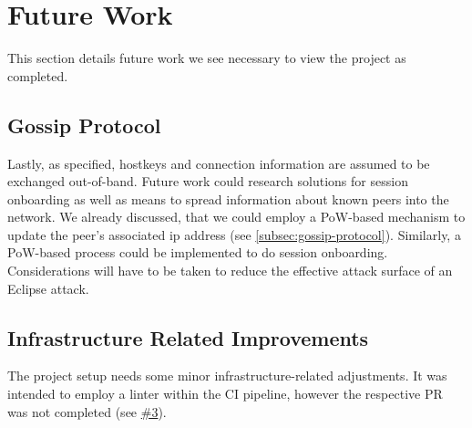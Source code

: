\section{Future Work}\label{sec:future-work}

This section details future work we see necessary to view the project as completed.

\subsection{Gossip Protocol}\label{subsec:gossip-protocol-future-work}

Lastly, as specified, hostkeys and connection information are assumed to be exchanged out-of-band.
Future work could research solutions for session onboarding as well as means to spread
information about known peers into the network.
We already discussed, that we could employ a PoW-based mechanism to update the peer's associated ip address (see \autoref{subsec:gossip-protocol}).
Similarly, a PoW-based process could be implemented to do session onboarding.
Considerations will have to be taken to reduce the effective attack surface of an Eclipse attack.

\subsection{Infrastructure Related Improvements}\label{subsec:infrastructure-related}

The project setup needs some minor infrastructure-related adjustments.
It was intended to employ a linter within the CI pipeline, however the respective PR
was not completed (see \href{https://gitlab.lrz.de/netintum/teaching/p2psec\_projects\_2022/Gossip-10/-/merge_requests/3}{\#3}).
